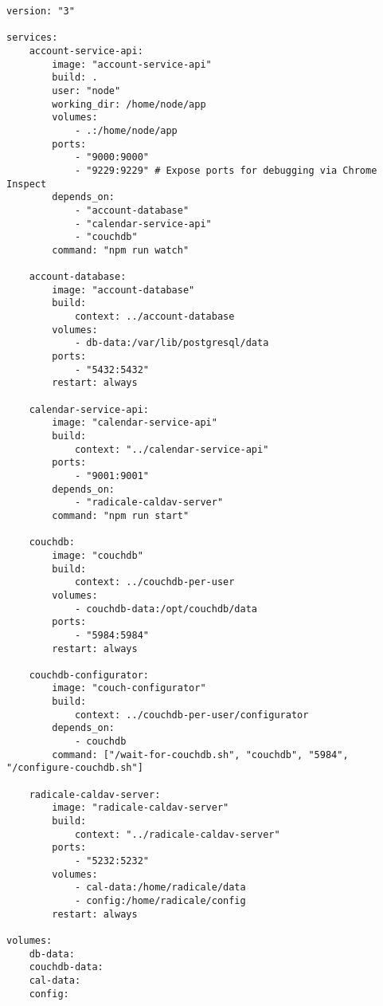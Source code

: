 \begin{verbatim}
version: "3"

services:
    account-service-api:
        image: "account-service-api"
        build: .
        user: "node"
        working_dir: /home/node/app
        volumes:
            - .:/home/node/app
        ports:
            - "9000:9000"
            - "9229:9229" # Expose ports for debugging via Chrome Inspect
        depends_on:
            - "account-database"
            - "calendar-service-api"
            - "couchdb"
        command: "npm run watch"

    account-database:
        image: "account-database"
        build:
            context: ../account-database
        volumes:
            - db-data:/var/lib/postgresql/data
        ports:
            - "5432:5432"
        restart: always

    calendar-service-api:
        image: "calendar-service-api"
        build:
            context: "../calendar-service-api"
        ports:
            - "9001:9001"
        depends_on:
            - "radicale-caldav-server"
        command: "npm run start"

    couchdb:
        image: "couchdb"
        build:
            context: ../couchdb-per-user
        volumes:
            - couchdb-data:/opt/couchdb/data
        ports:
            - "5984:5984"
        restart: always

    couchdb-configurator:
        image: "couch-configurator"
        build:
            context: ../couchdb-per-user/configurator
        depends_on:
            - couchdb
        command: ["/wait-for-couchdb.sh", "couchdb", "5984", "/configure-couchdb.sh"]

    radicale-caldav-server:
        image: "radicale-caldav-server"
        build:
            context: "../radicale-caldav-server"
        ports:
            - "5232:5232"
        volumes:
            - cal-data:/home/radicale/data
            - config:/home/radicale/config
        restart: always

volumes:
    db-data:
    couchdb-data:
    cal-data:
    config:
\end{verbatim}

